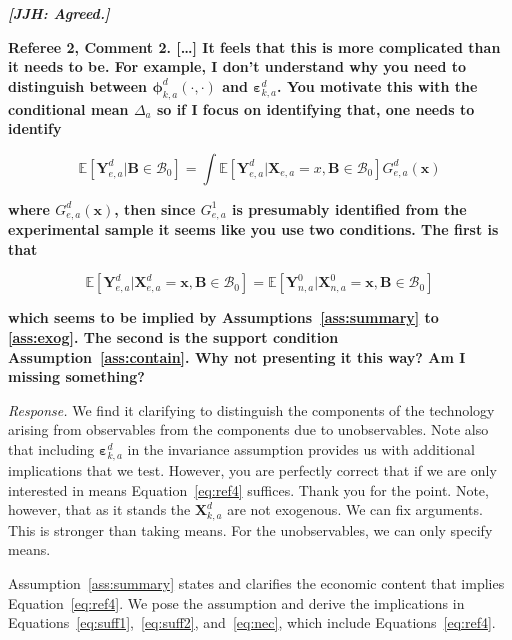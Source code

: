 \textbf{\textit{[JJH: Agreed.]}}

\noindent \textbf{Referee 2, Comment 2. [\ldots] It feels that this is more complicated than it needs to be. For example, I don't understand why you need to distinguish between $\bm{\phi}_{k,a}^d \left( \cdot, \cdot \right) $ and $\bm{\varepsilon}_{k,a}^d$. You motivate this with the conditional mean $\Delta_a$ so if I focus on identifying that, one needs to identify}

\begin{equation}
\mathbb{E} \left[ \bm{Y}_{e,a}^d | \bm{B} \in \mathcal{B}_0 \right] = \int \mathbb{E} \left[ \bm{Y}_{e,a}^d | \bm{X}_{e,a} = x, \bm{B} \in \mathcal{B}_0 \right] G_{e,a}^d \left( \bm{x} \right)
\end{equation}

\textbf{where $G_{e,a}^d \left( \bm{x} \right)$, then since $G_{e,a}^1$ is presumably identified from the experimental sample it seems like you use two conditions. The first is that}

\begin{equation}
\mathbb{E} \left[  \bm{Y}_{e,a}^d | \bm{X}_{e,a}^d = \bm{x},  \bm{B} \in \mathcal{B}_0 \right] = \mathbb{E} \left[  \bm{Y}_{n,a}^0 | \bm{X}_{n,a}^0 = \bm{x},  \bm{B} \in \mathcal{B}_0 \right]  \label{eq:ref4}
\end{equation}

\textbf{which seems to be implied by Assumptions~\ref{ass:summary} to \ref{ass:exog}. The second is the support condition Assumption~\ref{ass:contain}. Why not presenting it this way? Am I missing something?}

\noindent \textit{Response.} We find it clarifying to distinguish the components of the technology arising from observables from the components due to unobservables. Note also that including $\bm{\varepsilon}_{k,a}^d$ in the invariance assumption provides us with additional implications that we test. However, you are perfectly correct that if we are only interested in means Equation~\eqref{eq:ref4} suffices. Thank you for the point. Note, however, that as it stands the $\bm{X}_{k,a}^d$ are not exogenous. We can fix arguments. This is stronger than taking means. For the unobservables, we can only specify means.

Assumption~\ref{ass:summary} states and clarifies the economic content that implies Equation~\eqref{eq:ref4}. We pose the assumption and derive the implications in Equations~\eqref{eq:suff1},~\eqref{eq:suff2}, and~\eqref{eq:nec},  which include Equations~\eqref{eq:ref4}. 

